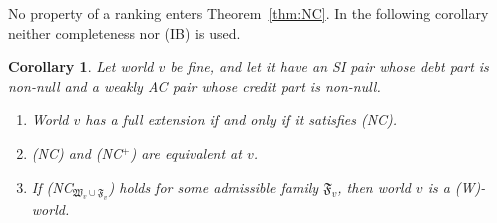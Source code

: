 \documentclass[11pt]{article}
\newtheorem{corollary}[theorem]{Corollary}
\theoremstyle{definition}\newtheorem{definition}[theorem]{Definition}
\theoremstyle{remark}\newtheorem{remark}[theorem]{Remark}
\begin{document}
No property of a ranking enters Theorem~\ref{thm:NC}. In the following
corollary neither completeness nor (IB) is used.

\begin{corollary}\label{cor:NCext}
Let world $v$ be fine, and let it have an SI pair whose debt part is
non-null and a weakly AC pair whose credit part is non-null.
\begin{enumerate}[label=(\roman*),leftmargin=*,itemsep=2pt]
\item World $v$ has a full extension if and only if it satisfies (NC).
\item (NC) and (NC$^+$) are equivalent at $v$.
\item If (NC$_{\mathfrak W_v\cup\mathfrak F_v}$) holds for some admissible
family $\mathfrak F_v$, then world $v$ is a (W)-world.
\end{enumerate}
\end{corollary}
\end{document}
